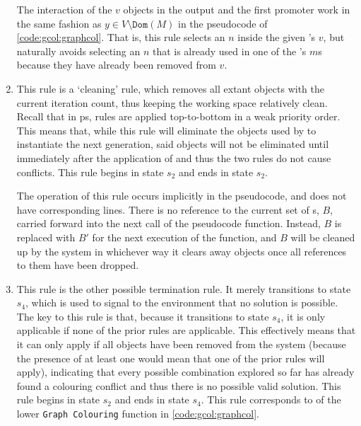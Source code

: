 \begin{enumerate}
The interaction of the \(v\) objects in the output and the first \gls{promoter} work in the same fashion as \(y \in V \setminus \texttt{Dom}(M)\) in the pseudocode of \cref{code:gcol:graphcol}.  That is, this rule selects an \(n\) inside the given \bo{}'s \(v\), but naturally avoids selecting an \(n\) that is already used in one of the \bo{}'s \(m\)s because they have already been removed from \(v\).

\item This rule is a `cleaning' rule, which removes all extant \bo{} objects with the current iteration count, thus keeping the working space relatively clean.  Recall that in \gls{ps}, rules are applied top-to-bottom in a  weak priority order.  This means that, while this rule will eliminate the \bo{} objects used by  to instantiate the next generation, said objects will not be eliminated until immediately after the application of  and thus the two rules do not cause conflicts.  This rule begins in state \(s_2\) and ends in state \(s_2\).

The operation of this rule occurs implicitly in the pseudocode, and does not have corresponding lines.  There is no reference to the current set of \bo{}s, \(B\), carried forward into the next call of the pseudocode function.  Instead, \(B\) is replaced with \(B'\) for the next execution of the function, and \(B\) will be cleaned up by the system in whichever way it clears away objects once all references to them have been dropped.

\item This rule is the other possible termination rule.  It merely transitions to state \(s_4\), which is used to signal to the environment that no solution is possible.  The key to this rule is that, because it transitions to state \(s_4\), it is only applicable if none of the prior rules are applicable.  This effectively means that it can only apply if all \bo{} objects have been removed from the system (because the presence of at least one \bo{} would mean that one of the prior rules will apply), indicating that every possible combination explored so far has already found a colouring conflict and thus there is no possible valid solution.  This rule begins in state \(s_2\) and ends in state \(s_4\).  This rule corresponds to  of the lower \texttt{Graph Colouring} function in \cref{code:gcol:graphcol}.

\end{enumerate}

